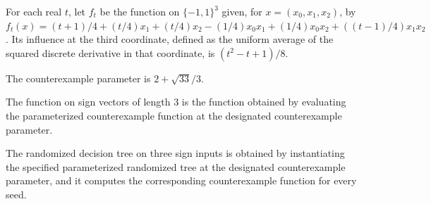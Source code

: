 \begin{theorem}
\label{FABL.influence_osssCounterexampleAt_two}
\leanok
{}
For each real $t$, let $f_t$ be the function on $\{−1,1\}^3$ given, for
$x=(x_0,x_1,x_2)$, by
$f_t(x)=(t+1)/4+(t/4)x_1+(t/4)x_2-(1/4)x_0x_1+(1/4)x_0x_2+((t-1)/4)x_1x_2$. Its
influence at the third coordinate, defined as the uniform average of the squared
discrete derivative in that coordinate, is $(t^2-t+1)/8$.
\end{theorem}

\begin{definition}
\label{FABL.osssCounterexampleParameter}
\leanok
The counterexample parameter is $2+\sqrt{33}/3$.
\end{definition}

\begin{definition}
\label{FABL.osssCounterexample}
\leanok
{}
The function on sign vectors of length $3$ is the function obtained by evaluating the
parameterized counterexample function at the designated counterexample parameter.
\end{definition}

\begin{definition}
\label{FABL.osssCounterexampleRandomizedTree}
\leanok
{}
The randomized decision tree on three sign inputs is obtained by instantiating the
specified parameterized randomized tree at the designated counterexample parameter, and
it computes the corresponding counterexample function for every seed.
\end{definition}


